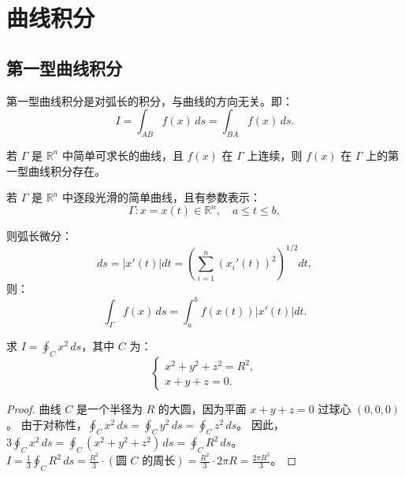\documentclass[lang=cn,10pt,thmcnt=section]{elegantbook}
\begin{document}
\section{曲线积分}

\subsection{第一型曲线积分}
第一型曲线积分是对弧长的积分，与曲线的方向无关。即：
\[
I = \int_{AB} f(x) \, ds = \int_{BA} f(x) \, ds.
\]

若 $\Gamma$ 是 $\mathbb{R}^n$ 中简单可求长的曲线，且 $f(x)$ 在 $\Gamma$ 上连续，则 $f(x)$ 在 $\Gamma$ 上的第一型曲线积分存在。

若 $\Gamma$ 是 $\mathbb{R}^n$ 中逐段光滑的简单曲线，且有参数表示：
\[
\Gamma: x = x(t) \in \mathbb{R}^n, \quad a \leq t \leq b,
\]

则弧长微分：
\[
ds = |x'(t)| dt = \left( \sum_{i=1}^{n} (x_i'(t))^2 \right)^{1/2} dt,
\]
则：
\[
\int_{\Gamma} f(x) \, ds = \int_{a}^{b} f(x(t)) |x'(t)| dt.
\]


\begin{example}
	求 $I = \oint_{C} x^2 \, ds$，其中 $C$ 为：
\[
\begin{cases}
x^2 + y^2 + z^2 = R^2, \\
x + y + z = 0.
\end{cases}
\]
\end{example}

\begin{proof}
	曲线 $C$ 是一个半径为 $R$ 的大圆，因为平面 $x+y+z=0$ 过球心 $(0,0,0)$。
由于对称性，$\oint_C x^2 \, ds = \oint_C y^2 \, ds = \oint_C z^2 \, ds$。
因此，$3 \oint_C x^2 \, ds = \oint_C (x^2+y^2+z^2) \, ds = \oint_C R^2 \, ds$。
$I = \frac{1}{3} \oint_C R^2 \, ds = \frac{R^2}{3} \cdot (\text{圆 } C \text{ 的周长}) = \frac{R^2}{3} \cdot 2\pi R = \frac{2\pi R^3}{3}$。
\end{proof}
\end{document}
